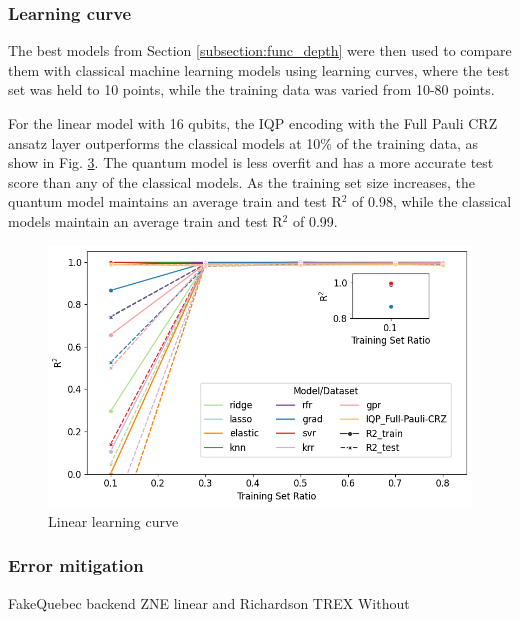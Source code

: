 \documentclass[journal=jacsat,manuscript=article]{achemso}
\begin{document}
\begin{figure}[H]
\begin{subfigure}[b]{\textwidth}
		\caption{}
		\label{fig:16qubit_Sine_RUD_AL}
	\end{subfigure}
	\caption{}
	\label{fig:16qubit_Func_RUD_AL}
\end{figure}

\subsubsection{Learning curve}
The best models from Section \ref{subsection:func_depth} were then used to compare them with classical machine learning models using learning curves, where the test set was held to 10 points, while the training data was varied from 10-80 points.

For the linear model with 16 qubits, the IQP encoding with the Full Pauli CRZ ansatz layer outperforms the classical models at 10\% of the training data, as show in  Fig. \ref{fig:linear_learning_curves}.
The quantum model is less overfit and has a more accurate test score than any of the classical models. 
As the training set size increases, the quantum model maintains an average train and test R$^{2}$ of 0.98, while the classical models maintain an average train and test R$^{2}$ of 0.99.
\begin{figure}[H]
	\centering
	\includegraphics[width=\textwidth]{images/Function_Fitting/linear_learning_curves.png}
	\caption{Linear learning curve}
	\label{fig:linear_learning_curves}
\end{figure}



\subsubsection{Error mitigation}
FakeQuebec backend
ZNE linear and Richardson
TREX
Without
\end{document}
